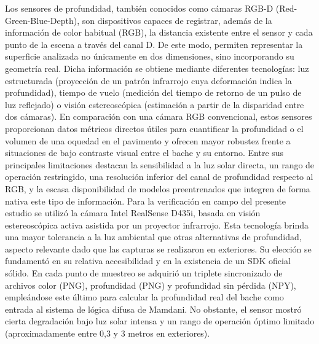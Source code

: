 Los sensores de profundidad, también conocidos como cámaras RGB-D (Red-Green-Blue-Depth), son dispositivos capaces de registrar, además de la información de color habitual (RGB), la distancia existente entre el sensor y cada punto de la escena a través del canal D. De este modo, permiten representar la superficie analizada no únicamente en dos dimensiones, sino incorporando su geometría real. Dicha información se obtiene mediante diferentes tecnologías: luz estructurada (proyección de un patrón infrarrojo cuya deformación indica la profundidad), tiempo de vuelo (medición del tiempo de retorno de un pulso de luz reflejado) o visión estereoscópica (estimación a partir de la disparidad entre dos cámaras).
En comparación con una cámara RGB convencional, estos sensores proporcionan datos métricos directos útiles para cuantificar la profundidad o el volumen de una oquedad en el pavimento y ofrecen mayor robustez frente a situaciones de bajo contraste visual entre el bache y su entorno. Entre sus principales limitaciones destacan la sensibilidad a la luz solar directa, un rango de operación restringido, una resolución inferior del canal de profundidad respecto al RGB, y la escasa disponibilidad de modelos preentrenados que integren de forma nativa este tipo de información.
Para la verificación en campo del presente estudio se utilizó la cámara Intel RealSense D435i, basada en visión estereoscópica activa asistida por un proyector infrarrojo. Esta tecnología brinda una mayor tolerancia a la luz ambiental que otras alternativas de profundidad, aspecto relevante dado que las capturas se realizaron en exteriores. Su elección se fundamentó en su relativa accesibilidad y en la existencia de un SDK oficial sólido. En cada punto de muestreo se adquirió un triplete sincronizado de archivos color (PNG), profundidad (PNG) y profundidad sin pérdida (NPY), empleándose este último para calcular la profundidad real del bache como entrada al sistema de lógica difusa de Mamdani. No obstante, el sensor mostró cierta degradación bajo luz solar intensa y un rango de operación óptimo limitado (aproximadamente entre 0,3 y 3 metros en exteriores).



